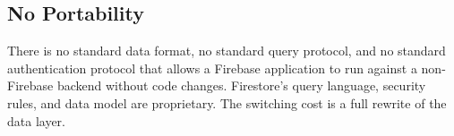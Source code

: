 \subsection{No Portability}

There is no standard data format, no standard query protocol, and no
standard authentication protocol that allows a Firebase application to
run against a non-Firebase backend without code changes. Firestore's
query language, security rules, and data model are proprietary. The
switching cost is a full rewrite of the data layer.

